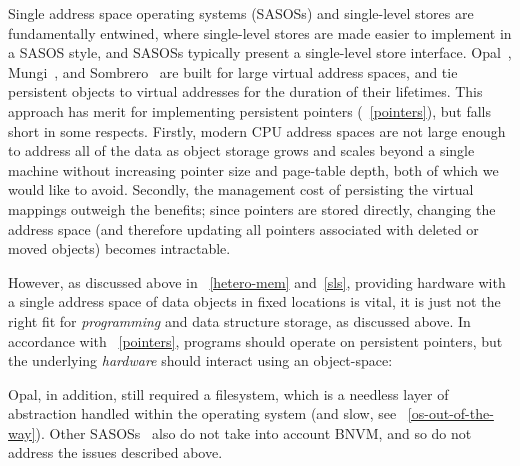{    Single address space operating systems (SASOSs) and single-level stores are fundamentally entwined,
    where single-level stores are made easier to implement in a SASOS style, and SASOSs typically
    present a single-level store interface. Opal~\cite{chase:sosp01}, Mungi~\cite{heiser:scse9314}, and
    Sombrero~\cite{miller:osr00} are built for large virtual address spaces, and tie persistent objects
    to virtual addresses for the duration of their lifetimes. This approach has merit for implementing
    persistent pointers (\observation~\ref{pointers}), but falls short in some respects. Firstly, modern
    CPU address spaces are not large enough to address all of the data as object storage grows and
    scales beyond a single machine without increasing pointer size and page-table depth, both of which
    we would like to avoid. Secondly, the management cost of persisting the virtual mappings
    outweigh the benefits; since pointers are stored directly, changing the address space (and
    therefore updating all pointers associated with deleted or moved objects) becomes intractable.

    However, as discussed above in \observations~\ref{hetero-mem} and~\ref{sls}, providing hardware with
    a single address space of data objects in fixed locations is vital, it is just not the right fit for
    \textit{programming} and data structure storage, as discussed above. In accordance with
    \observation~\ref{pointers}, programs should operate on persistent pointers, but the underlying
    \textit{hardware} should interact using an object-space:


    Opal, in addition, still required a filesystem, which is a needless layer of abstraction handled
    within the operating system (and slow, see \observation~\ref{os-out-of-the-way}). Other
    SASOSs~\cite{roscoe:osr94,heiser:scse9314,miller:osr00} also do not take into account BNVM, and so
    do not address the issues described above.

}
